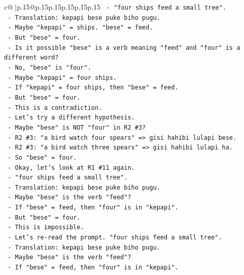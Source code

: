 \documentclass{article}
\begin{document}
{\begin{supertabular}{c@{$\;$}|p{.15\linewidth}@{}p{.15\linewidth}p{.15\linewidth}p{.15\linewidth}p{.15\linewidth}p{.15\linewidth}}
{{{\texttt{        {-} "four ships feed a small tree".} \\
\texttt{        {-} Translation: kepapi bese puke biho pugu.} \\
\texttt{        {-} Maybe "kepapi" = ships. "bese" = feed.} \\
\texttt{        {-} But "bese" = four.} \\
\texttt{        {-} Is it possible "bese" is a verb meaning "feed" and "four" is a different word?} \\
\texttt{        {-} No, "bese" is "four".} \\
\texttt{        {-} Maybe "kepapi" = four ships.} \\
\texttt{        {-} If "kepapi" = four ships, then "bese" = feed.} \\
\texttt{        {-} But "bese" = four.} \\
\texttt{        {-} This is a contradiction.} \\
\texttt{        {-} Let's try a different hypothesis.} \\
\texttt{        {-} Maybe "bese" is NOT "four" in R2 \#3?} \\
\texttt{        {-} R2 \#3: "a bird watch four spears" => gisi hahibi lulapi bese.} \\
\texttt{        {-} R2 \#3: "a bird watch three spears" => gisi hahibi lulapi ha.} \\
\texttt{        {-} So "bese" = four.} \\
\texttt{        {-} Okay, let's look at R1 \#11 again.} \\
\texttt{        {-} "four ships feed a small tree".} \\
\texttt{        {-} Translation: kepapi bese puke biho pugu.} \\
\texttt{        {-} Maybe "bese" is the verb "feed"?} \\
\texttt{        {-} If "bese" = feed, then "four" is in "kepapi".} \\
\texttt{        {-} But "bese" = four.} \\
\texttt{        {-} This is impossible.} \\
\texttt{        {-} Let's re{-}read the prompt. "four ships feed a small tree".} \\
\texttt{        {-} Translation: kepapi bese puke biho pugu.} \\
\texttt{        {-} Maybe "bese" is the verb "feed"?} \\
\texttt{        {-} If "bese" = feed, then "four" is in "kepapi".} \\
}}}
\end{supertabular}}
\end{document}
